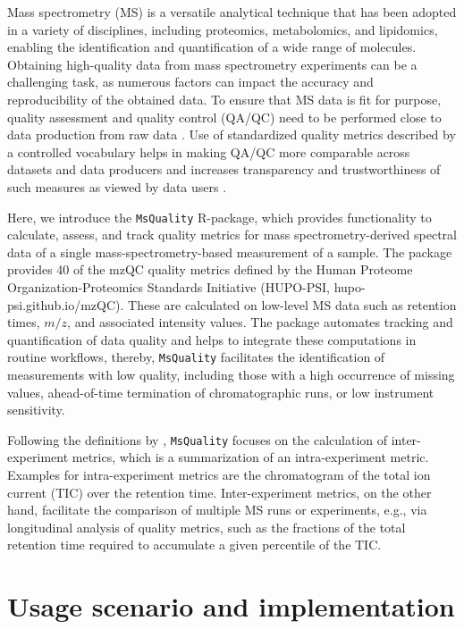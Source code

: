 \documentclass{bioinfo}
\begin{document}
Mass spectrometry (MS) is a versatile analytical technique that has been adopted
in a variety of disciplines, including proteomics, metabolomics, and lipidomics, 
enabling the identification and quantification of a wide range of molecules. 
Obtaining high-quality data from mass spectrometry experiments can be a 
challenging task, as numerous factors can impact the accuracy and 
reproducibility of the obtained data. To ensure that MS data is fit for purpose, 
quality assessment and quality control (QA/QC) need to be performed close
to data production from raw data \citep{Koecher2011,Bereman2015}. Use of standardized 
quality metrics described by a controlled vocabulary helps in making QA/QC more 
comparable across datasets and data producers and increases transparency and 
trustworthiness of such measures as viewed by data users 
\citep{Mayer2012,Mayer2013}. \newpage

Here, we introduce the \texttt{MsQuality} R-package, which provides 
functionality to calculate, assess, and track quality metrics for mass 
spectrometry-derived spectral data of a single mass-spectrometry-based 
measurement of a sample. 
The package provides 40 of the mzQC quality metrics defined by
the Human Proteome Organization-Proteomics Standards Initiative (HUPO-PSI,
hupo-psi.github.io/mzQC). These are calculated on low-level MS data
such as retention times, $m/z$, and associated intensity values.
The package automates tracking and quantification of data quality and 
helps to integrate these computations in routine workflows, thereby,
\texttt{MsQuality} facilitates the identification of measurements with low 
quality, including those with a high occurrence of missing values, 
ahead-of-time termination of chromatographic runs, or low instrument sensitivity. \newpage

Following the definitions by \cite{Bittremieux2017}, \texttt{MsQuality}
focuses on the calculation of inter-experiment metrics, which is a
summarization of an intra-experiment metric. Examples for
intra-experiment metrics are the chromatogram of the total ion current (TIC) 
over the retention time. Inter-experiment metrics, on the other hand, 
facilitate the comparison of multiple MS runs or experiments, 
e.g., via longitudinal analysis of quality metrics, such as the
fractions of the total retention time required to accumulate a given
percentile of the TIC.

\section{Usage scenario and implementation} \label{usagescenario}
\end{document}
